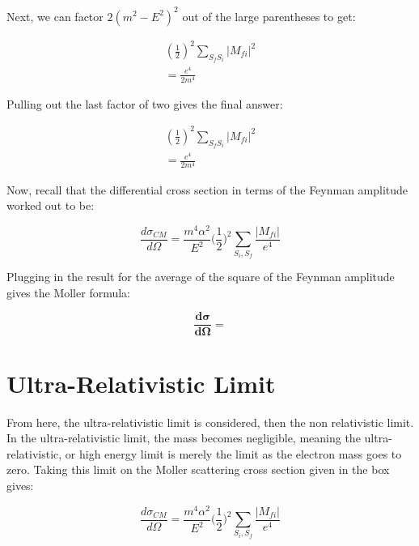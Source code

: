 \documentclass[a4]{article}
\begin{document}
    Next, we can factor $2 (m^2 - E^2)^2$ out of the large parentheses to get:

    \begin{eqnarray}
        (\frac{1}{2})^2 \sum_{S_f S_i} |M_{f i}|^2 \\
        = \frac{e^4}{2 m^4}
    \end{eqnarray}

    Pulling out the last factor of two gives the final answer:

    \begin{eqnarray}
        (\frac{1}{2})^2 \sum_{S_f S_i} |M_{f i}|^2 \\
        = \frac{e^4}{2 m^4}
    \end{eqnarray}

    Now, recall that the differential cross section in terms of the Feynman amplitude worked out to be:

    \begin{equation}
        \frac{d \sigma_{CM}}{d \Omega} = \frac{m^4 \alpha^2}{E^2} \bigg( \frac{1}{2} \bigg)^2 \sum_{S_i, S_f} \frac{|M_{fi}|}{e^4}
    \end{equation}

    Plugging in the result for the average of the square of the Feynman amplitude gives the Moller formula:

    \begin{framed}
        \begin{equation}
            \mathbf{\frac{d \sigma}{d \Omega} = }
        \end{equation}
    \end{framed}

    \section*{Ultra-Relativistic Limit}

    From here, the ultra-relativistic limit is considered, then the non relativistic limit. In the ultra-relativistic limit, the mass becomes negligible, meaning the ultra-relativistic, or high energy limit is merely the limit as the electron
    mass goes to zero. Taking this limit on the Moller scattering cross section given in the box gives:

    \begin{equation}
        \frac{d \sigma_{CM}}{d \Omega} = \frac{m^4 \alpha^2}{E^2} \bigg( \frac{1}{2} \bigg)^2 \sum_{S_i, S_f} \frac{|M_{fi}|}{e^4}
    \end{equation}
\end{document}
